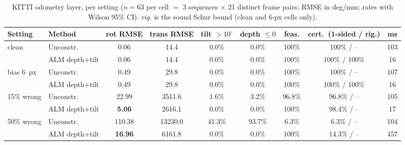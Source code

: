 \begin{table}[t]
\centering
\caption{KITTI odometry layer, per setting ($n=63$ per cell $=$ 3 sequences $\times$ 21 distinct frame pairs; RMSE in deg/mm; rates with Wilson 95\% CI). \emph{rig.} is the sound Schur bound (clean and 6-px cells only).}
\label{tab:kitti}
\scriptsize
\setlength{\tabcolsep}{3pt}
\begin{tabular}{@{}llccccccc@{}}
\toprule
Setting & Method & rot RMSE & trans RMSE & tilt $>10^\circ$ & depth $\le0$ & feas. & cert.\ (1-sided / rig.) & ms \\
\midrule
clean & Unconstr. & 0.06 & 14.4 & 0.0\% & 0.0\% & 100\% & 100\% / -- & 103 \\
 & ALM depth+tilt & 0.06 & 14.4 & 0.0\% & 0.0\% & 100\% & 100\% / 100\% & 16 \\
bias 6~px & Unconstr. & 0.49 & 29.8 & 0.0\% & 0.0\% & 100\% & 100\% / -- & 107 \\
 & ALM depth+tilt & 0.49 & 29.8 & 0.0\% & 0.0\% & 100\% & 100\% / 100\% & 16 \\
15\% wrong & Unconstr. & 22.99 & 3511.6 & 1.6\% & 3.2\% & 96.8\% & 96.8\% / -- & 105 \\
 & ALM depth+tilt & \textbf{5.06} & 2616.1 & 0.0\% & 0.0\% & 100\% & 98.4\% / -- & 17 \\
50\% wrong & Unconstr. & 110.38 & 13230.0 & 41.3\% & 93.7\% & 6.3\% & 6.3\% / -- & 104 \\
 & ALM depth+tilt & \textbf{16.96} & 6161.8 & 0.0\% & 0.0\% & 100\% & 14.3\% / -- & 457 \\
\bottomrule
\end{tabular}
\end{table}

\begin{table}[t]
\centering
\caption{UTIAS In-The-Dark, `run\_000000`, $n=38$ per cell (median rotation/translation RMSE; rates over 38).}
\label{tab:utias}
\scriptsize
\setlength{\tabcolsep}{2.2pt}
\end{table}

